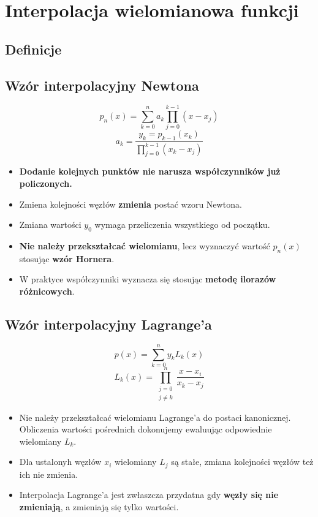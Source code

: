 \documentclass[../mn-notatki.tex]{subfiles}
\begin{document}
\section{Interpolacja wielomianowa funkcji}

\subsection{Definicje}
\begin{tcolorbox}
\end{tcolorbox}

\subsection{Wzór interpolacyjny Newtona}
\begin{tcolorbox}
\[
p_n(x) = \sum_{k=0}^{n} a_k \prod_{j=0}^{k-1} (x-x_j)
\]
\[
a_k = \frac{y_k = p_{k-1}(x_k)}{\prod_{j=0}^{k-1}(x_k - x_j)}
\]
\end{tcolorbox}

\begin{itemize}
    \item \textbf{Dodanie kolejnych punktów nie narusza współczynników już
    policzonych.}
    \item Zmiena kolejności węzłów \textbf{zmienia} postać wzoru Newtona.
    \item Zmiana wartości $y_0$ wymaga przeliczenia wszystkiego od początku.
    \item \textbf{Nie należy przekształcać wielomianu}, lecz wyznaczyć wartość
    $p_n(x)$ stosując \textbf{wzór Hornera}.
    \item W praktyce współczynniki wyznacza się stosując \textbf{metodę ilorazów
    różnicowych}.
\end{itemize}

\subsection{Wzór interpolacyjny Lagrange'a}
\begin{tcolorbox}
\[
p(x) = \sum_{k=0}^{n} y_k L_k(x)
\]
\[
L_k(x) = \prod_{\substack{j=0\\j\neq k}}^{n} \frac{x-x_i}{x_k-x_j}
\]
\end{tcolorbox}

\begin{itemize}
    \item Nie należy przekształcać wielomianu Lagrange'a do postaci kanonicznej.
    Obliczenia wartości pośrednich dokonujemy ewaluując odpowiednie wielomiany
    $L_k$.
    \item Dla ustalonyh węzłów $x_i$ wielomiany $L_j$ są stałe, zmiana
    kolejności węzłów też ich nie zmienia.
    \item Interpolacja Lagrange'a jest zwłaszcza przydatna gdy \textbf{węzły
    się nie zmieniają}, a zmieniają się tylko wartości.
\end{itemize}
\end{document}
